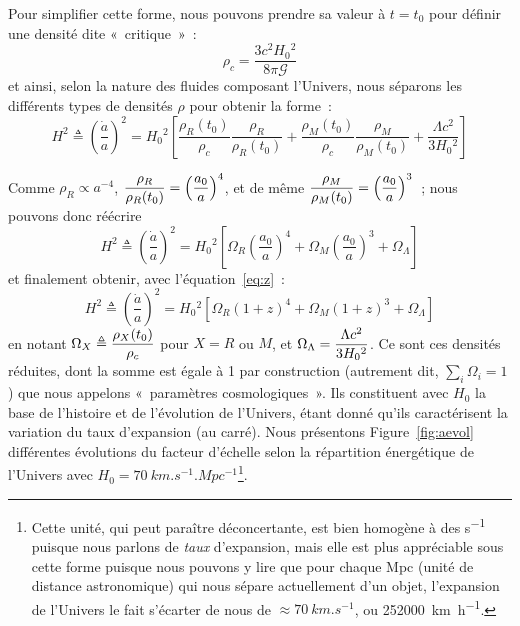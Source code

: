 \documentclass[../main/main.tex]{subfiles}
\begin{document}
Pour simplifier cette forme, nous pouvons prendre sa valeur à $t = t_0$ pour
définir une densité dite «~critique~»~:
\begin{equation}
    \rho_c = \frac{3c^2H_0{}^2}{8\pi\mathcal{G}}
\end{equation}
et ainsi, selon la nature des fluides composant l'Univers, nous séparons les
différents types de densités $\rho$ pour obtenir la forme~:
\begin{equation}
    H^2 \triangleq \left( \frac{\dot{a}}{a} \right)^2 =
    H_0{}^2 \left[ \frac{\rho_R(t_0)}{\rho_c}\frac{\rho_R}{\rho_R(t_0)} +
                   \frac{\rho_M(t_0)}{\rho_c}\frac{\rho_M}{\rho_M(t_0)} +
                   \frac{\Lambda c^2}{3 H_0{}^2}
               \right]
\end{equation}

Comme $\rho_R \propto a^{-4}$, $\displaystyle\frac{\rho_R}{\rho_R(t_0)} =
\left(\frac{a_0}{a}\right)^4$, et de même $\displaystyle\frac{\rho_M}{\rho_M(t_0)} =
\left(\frac{a_0}{a}\right)^3$~;
nous pouvons donc réécrire
\begin{equation}
    H^2 \triangleq \left( \frac{\dot{a}}{a} \right)^2 =
    H_0{}^2 \left[ \Omega_R \left( \frac{a_0}{a} \right)^4 +
        \Omega_M \left( \frac{a_0}{a} \right)^3 +
    \Omega_\Lambda \right]
\end{equation}
et finalement obtenir, avec l'équation~\ref{eq:z}~:
\begin{equation}\label{eq:h2}
    H^2 \triangleq \left( \frac{\dot{a}}{a} \right)^2 =
    H_0{}^2 \left[ \Omega_R \left( 1+z \right)^4 +
        \Omega_M \left( 1+z \right)^3 +
    \Omega_\Lambda \right]
\end{equation}
en notant $\Omega_X \triangleq \displaystyle \frac{\rho_X(t_0)}{\rho_c}$ pour $X = R$ ou
$M$, et $\Omega_\Lambda = \displaystyle \frac{\Lambda c^2}{3 H_0{}^2}$. Ce sont ces
densités réduites, dont la somme est égale à 1 par construction (autrement dit,
$\sum_i \Omega_i = 1$) que nous appelons «~paramètres cosmologiques~». Ils
constituent avec $H_0$ la base de l'histoire et de l'évolution de l'Univers,
étant donné qu'ils caractérisent la variation du taux d'expansion (au carré).
Nous présentons Figure~\ref{fig:aevol} différentes évolutions du facteur
d'échelle selon la répartition énergétique de l'Univers avec $H_0 =
\SI{70}{km.s^{-1}.Mpc^{-1}}$\footnote{Cette unité, qui peut paraître
    déconcertante, est bien homogène à des \si{s^{-1}} puisque nous parlons de
    \textit{taux} d'expansion, mais elle est plus appréciable sous cette forme
    puisque nous pouvons y lire que pour chaque \si{Mpc} (unité de distance
    astronomique) qui nous sépare actuellement d'un objet, l'expansion de
    l'Univers le fait s'écarter de nous de $\approx \SI{70}{km.s^{-1}}$, ou
\SI{252000}{km.h^{-1}}.}.
\end{document}
